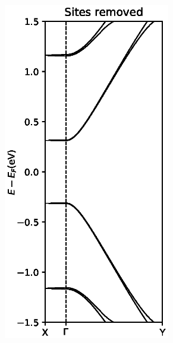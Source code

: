 \begin{figure}[ht]
\begin{subfigure}[b]{0.3\textwidth}
		\centering
		\includegraphics[width=0.8\textwidth]{Figures/MS2OHSitesRemoved.eps}
		\vspace{-2\baselineskip}
		\caption{}
		\label{MS2OHremove}
	\end{subfigure}
	\begin{subfigure}[b]{0.3\textwidth}
		\centering

\end{subfigure}
\end{figure}

